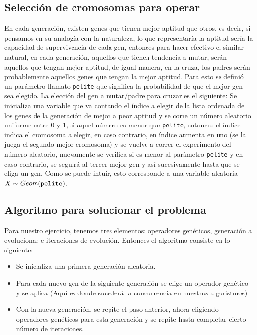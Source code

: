 \documentclass[a4paper,twocolumn,10pt]{article}
\begin{document}
\subsection{Selección de cromosomas para operar}
En cada generación, existen genes que tienen mejor aptitud que otros, es decir, si pensamos en su analogía con la naturaleza, lo que representaría la aptitud sería la capacidad de supervivencia de cada gen, entonces para hacer efectivo el similar natural, en cada generación, aquellos que tienen tendencia a mutar, serán aquellos que tengan mejor aptitud, de igual manera, en la cruza, los padres serán probablemente aquellos genes que tengan la mejor aptitud. Para esto se definió un parámetro llamato \verb|pelite| que significa la probabilidad de que el mejor gen sea elegido. La elección del gen a mutar/padre para cruzar es el siguiente: Se inicializa una variable que va contando el índice a elegir de la lista ordenada de los genes de la generación de mejor a peor aptitud y se corre un número aleatorio uniforme entre 0 y 1, si aquel número es menor que \verb|pelite|, entonces el índice indica el cromosoma a elegir, en caso contrario, en índice aumenta en uno (se la juega el segundo mejor cromosoma) y se vuelve a correr el experimento del número aleatorio, nuevamente se verifica si es menor al parámetro \verb|pelite| y en caso contrario, se seguirá al tercer mejor gen y así sucesivamente hasta que se eliga un gen. Como se puede intuir, esto corresponde a una variable aleatoria $X \sim Geom(\verb|pelite|)$.
\subsection{Algoritmo para solucionar el problema}
Para nuestro ejercicio, tenemos tres elementos: operadores genéticos, generación a evolucionar e iteraciones de evolución. Entonces el algoritmo consiste en lo siguiente:
\begin{itemize}
    \item Se inicializa una primera generación aleatoria.
    \item Para cada nuevo gen de la siguiente generación se elige un operador genético y se aplica (Aquí es donde sucederá la concurrencia en nuestros algoristmos)
    \item Con la nueva generación, se repite el paso anterior, ahora eligiendo operadores genéticos para esta generación y se repite hasta completar cierto número de iteraciones.
\end{itemize}
\end{document}
